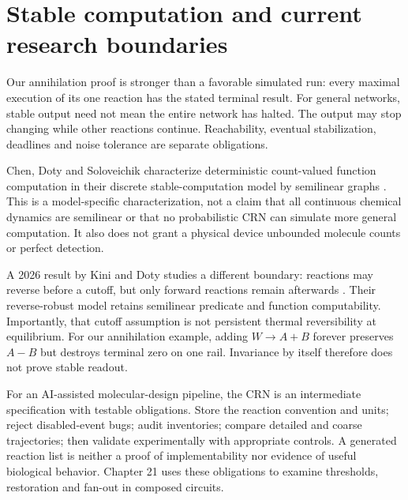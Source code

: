 \section{Stable computation and current research boundaries}

Our annihilation proof is stronger than a favorable simulated run: every
maximal execution of its one reaction has the stated terminal result.
For general networks, stable output need not mean the entire network has
halted. The output may stop changing while other reactions continue.
Reachability, eventual stabilization, deadlines and noise tolerance are
separate obligations.

Chen, Doty and Soloveichik characterize deterministic count-valued function
computation in their discrete stable-computation model by semilinear graphs
\cite{chen}. This is a model-specific characterization, not a claim that all
continuous chemical dynamics are semilinear or that no probabilistic CRN can
simulate more general computation. It also does not grant a physical device
unbounded molecule counts or perfect detection.

A 2026 result by Kini and Doty studies a different boundary: reactions may
reverse before a cutoff, but only forward reactions remain afterwards
\cite{kini}. Their reverse-robust model retains semilinear predicate and
function computability. Importantly, that cutoff assumption is not persistent
thermal reversibility at equilibrium. For our annihilation example, adding
$W\rightarrow A+B$ forever preserves $A-B$ but destroys terminal zero on one
rail. Invariance by itself therefore does not prove stable readout.

For an AI-assisted molecular-design pipeline, the CRN is an intermediate
specification with testable obligations. Store the reaction convention and
units; reject disabled-event bugs; audit inventories; compare detailed and
coarse trajectories; then validate experimentally with appropriate controls.
A generated reaction list is neither a proof of implementability nor evidence
of useful biological behavior. Chapter 21 uses these obligations to examine
thresholds, restoration and fan-out in composed circuits.

